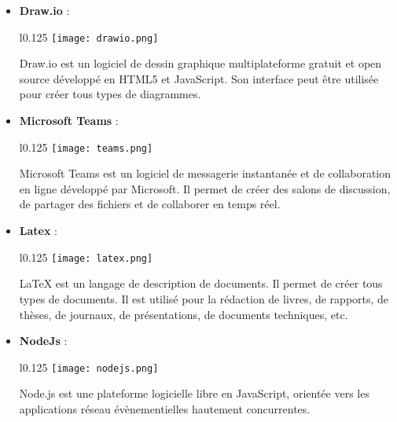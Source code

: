 \begin{itemize}
    \vspace{0.5cm}
    \item \textbf{Draw.io} :\\
    \begin{minipage}{\linewidth}
      \begin{wrapfigure}{l}{0.125\textwidth}
        \vspace{-0.5cm}
        \texttt{[image: drawio.png]} 
      \end{wrapfigure}
      Draw.io est un logiciel de dessin graphique multiplateforme gratuit et open source développé en HTML5 et JavaScript. Son interface peut être utilisée pour créer tous types de diagrammes.
    \end{minipage}

    \vspace{0.5cm}
    \item \textbf{Microsoft Teams} :\\
    \begin{minipage}{\linewidth}
      \begin{wrapfigure}{l}{0.125\textwidth}
        \vspace{-0.5cm}
        \texttt{[image: teams.png]} 
      \end{wrapfigure}
      Microsoft Teams est un logiciel de messagerie instantanée et de collaboration en ligne développé par Microsoft. Il permet de créer des salons de discussion, de partager des fichiers et de collaborer en temps réel.
    \end{minipage}

    \vspace{0.5cm}
    \item \textbf{Latex} :\\
    \begin{minipage}{\linewidth}
      \begin{wrapfigure}{l}{0.125\textwidth}
        \vspace{-0.5cm}
        \texttt{[image: latex.png]} 
      \end{wrapfigure}
      LaTeX est un langage de description de documents. Il permet de créer tous types de documents. Il est utilisé pour la rédaction de livres, de rapports, de thèses, de journaux, de présentations, de documents techniques, etc.
    \end{minipage}

    \vspace{0.5cm}
    \item \textbf{NodeJs} :\\
    \begin{minipage}{\linewidth}
      \begin{wrapfigure}{l}{0.125\textwidth}
        \vspace{-0.5cm}
        \texttt{[image: nodejs.png]}
      \end{wrapfigure}
      Node.js est une plateforme logicielle libre en JavaScript, orientée vers les applications réseau évènementielles hautement concurrentes.
    \end{minipage}
    \vspace{0.5cm}


\end{itemize}

